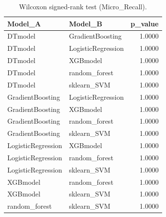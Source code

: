 \begin{table}[t]
\centering
\begin{tabular}{llr}
\toprule
Model_A & Model_B & p_value \\
\midrule
DTmodel & GradientBoosting & 1.0000 \\
DTmodel & LogisticRegression & 1.0000 \\
DTmodel & XGBmodel & 1.0000 \\
DTmodel & random_forest & 1.0000 \\
DTmodel & sklearn_SVM & 1.0000 \\
GradientBoosting & LogisticRegression & 1.0000 \\
GradientBoosting & XGBmodel & 1.0000 \\
GradientBoosting & random_forest & 1.0000 \\
GradientBoosting & sklearn_SVM & 1.0000 \\
LogisticRegression & XGBmodel & 1.0000 \\
LogisticRegression & random_forest & 1.0000 \\
LogisticRegression & sklearn_SVM & 1.0000 \\
XGBmodel & random_forest & 1.0000 \\
XGBmodel & sklearn_SVM & 1.0000 \\
random_forest & sklearn_SVM & 1.0000 \\
\bottomrule
\end{tabular}
\caption{Wilcoxon signed-rank test (Micro_Recall).}
\label{tab:wilcoxon_Micro_Recall}
\end{table}